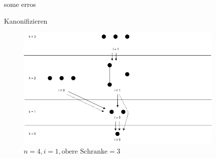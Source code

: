 \begin{frame}{some erros}
  \centering
  
\end{frame}

\begin{frame}{Kanonifizieren}
  \begin{table}[!t]
    \renewcommand{\arraystretch}{1.2}
    \centering
  \end{table}
\end{frame}

\begin{frame}{\insertsection}

  \begin{figure}[!b]
    \centering
    \includegraphics[width=0.9\textwidth,height=0.67\textheight,keepaspectratio]{./figures/backward-searchtree-bound3.png}
    \caption{$n=4,i=1,\text{obere Schranke}=3$}
    \label{fig:backward-searchtree-bound3}
  \end{figure}
\end{frame}


